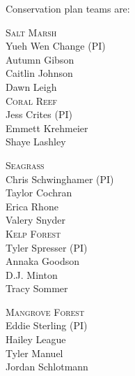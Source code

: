 \documentclass[t]{beamer}
\begin{document}
\begin{frame}[t]{Conservation plan teams are:}

\begin{multicols}{3}

\textsc{Salt Marsh}\\
Yueh Wen Change (PI)\\
Autumn Gibson\\
Caitlin Johnson\\
Dawn Leigh \\[2\baselineskip]

\textsc{Coral Reef}\\
Jess Crites (PI)\\
Emmett Krehmeier\\
Shaye Lashley\\

\columnbreak

\textsc{Seagrass}\\
{\small Chris Schwinghamer (PI)}\\
Taylor Cochran\\
Erica Rhone\\
Valery Snyder\\[2\baselineskip]

\textsc{Kelp Forest}\\
Tyler Spresser (PI)\\
Annaka Goodson\\
D.J. Minton \\
Tracy Sommer\\

\columnbreak

\textsc{Mangrove Forest}\\
Eddie Sterling (PI)\\
Hailey League\\
Tyler Manuel\\
Jordan Schlotmann\\


\end{multicols}

\end{frame}
\end{document}
